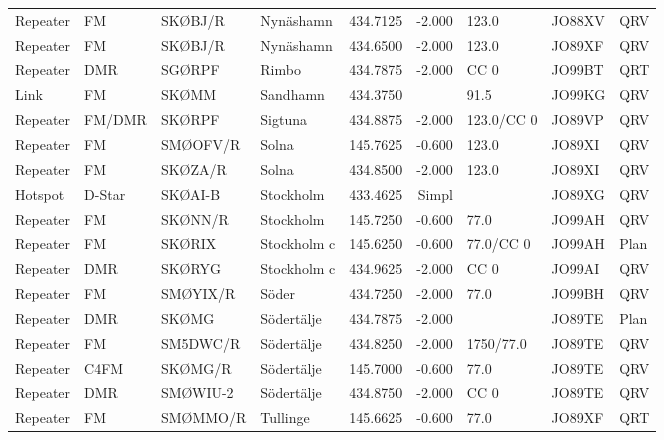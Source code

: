 \begin{longtable}{llllrrlll}
Repeater & FM          & SKØBJ/R  & Nynäshamn   & 434.7125     & -2.000     & 123.0      & JO88XV      & QRV      \\
Repeater & FM          & SKØBJ/R  & Nynäshamn   & 434.6500     & -2.000     & 123.0      & JO89XF      & QRV      \\
Repeater & DMR         & SGØRPF   & Rimbo       & 434.7875     & -2.000     & CC 0       & JO99BT      & QRT      \\
Link     & FM          & SKØMM    & Sandhamn    & 434.3750     &            & 91.5       & JO99KG      & QRV      \\
Repeater & FM/DMR      & SKØRPF   & Sigtuna     & 434.8875     & -2.000     & 123.0/CC 0 & JO89VP      & QRV      \\
Repeater & FM          & SMØOFV/R & Solna       & 145.7625     & -0.600     & 123.0      & JO89XI      & QRV      \\
Repeater & FM          & SKØZA/R  & Solna       & 434.8500     & -2.000     & 123.0      & JO89XI      & QRV      \\
Hotspot  & D-Star      & SKØAI-B  & Stockholm   & 433.4625     & Simpl      &            & JO89XG      & QRV      \\
Repeater & FM          & SKØNN/R  & Stockholm   & 145.7250     & -0.600     & 77.0       & JO99AH      & QRV      \\
Repeater & FM          & SKØRIX   & Stockholm c & 145.6250     & -0.600     & 77.0/CC 0  & JO99AH      & Plan     \\
Repeater & DMR         & SKØRYG   & Stockholm c & 434.9625     & -2.000     & CC 0       & JO99AI      & QRV      \\
Repeater & FM          & SMØYIX/R & Söder       & 434.7250     & -2.000     & 77.0       & JO99BH      & QRV      \\
Repeater & DMR         & SKØMG    & Södertälje  & 434.7875     & -2.000     &            & JO89TE      & Plan     \\
Repeater & FM          & SM5DWC/R & Södertälje  & 434.8250     & -2.000     & 1750/77.0  & JO89TE      & QRV      \\
Repeater & C4FM        & SKØMG/R  & Södertälje  & 145.7000     & -0.600     & 77.0       & JO89TE      & QRV      \\
Repeater & DMR         & SMØWIU-2 & Södertälje  & 434.8750     & -2.000     & CC 0       & JO89TE      & QRV      \\
Repeater & FM          & SMØMMO/R & Tullinge    & 145.6625     & -0.600     & 77.0       & JO89XF      & QRT      \\

\end{longtable}
